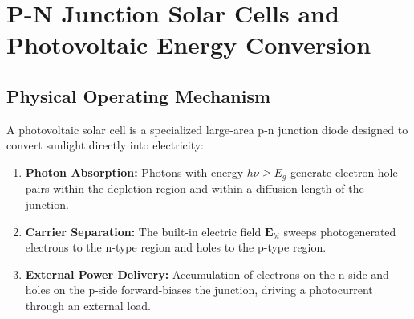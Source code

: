 \section{P-N Junction Solar Cells and Photovoltaic Energy Conversion}
\subsection{Physical Operating Mechanism}
A photovoltaic solar cell is a specialized large-area p-n junction diode designed to convert sunlight directly into electricity:
\begin{enumerate}
    \item \textbf{Photon Absorption:} Photons with energy $h\nu \ge E_g$ generate electron-hole pairs within the depletion region and within a diffusion length of the junction.
    \item \textbf{Carrier Separation:} The built-in electric field $\mathbf{E}_{bi}$ sweeps photogenerated electrons to the n-type region and holes to the p-type region.
    \item \textbf{External Power Delivery:} Accumulation of electrons on the n-side and holes on the p-side forward-biases the junction, driving a photocurrent through an external load.
\end{enumerate}


